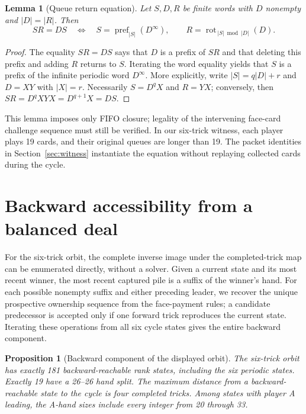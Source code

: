 \documentclass[11pt]{article}
\newtheorem{lemma}{Lemma}
\newtheorem{proposition}{Proposition}
\begin{document}
\begin{lemma}[Queue return equation]
Let $S,D,R$ be finite words with $D$ nonempty and $|D|=|R|$. Then
\[
SR=DS\quad\Longleftrightarrow\quad
S=\operatorname{pref}_{|S|}(D^\infty),\qquad
R=\operatorname{rot}_{\,|S|\bmod |D|}(D).
\]
\end{lemma}
\begin{proof}
The equality $SR=DS$ says that $D$ is a prefix of $S R$ and that deleting
this prefix and adding $R$ returns to $S$. Iterating the word equality yields
that $S$ is a prefix of the infinite periodic word $D^\infty$. More
explicitly, write $|S|=q|D|+r$ and $D=XY$ with $|X|=r$. Necessarily
$S=D^qX$ and $R=YX$; conversely, then
$SR=D^qXYX=D^{q+1}X=DS$.
\end{proof}

This lemma imposes only FIFO closure; legality of the intervening face-card
challenge sequence must still be verified. In our six-trick witness, each
player plays 19 cards, and their original queues are longer than 19. The
packet identities in Section~\ref{sec:witness} instantiate the equation without
replaying collected cards during the cycle.

\section{Backward accessibility from a balanced deal}

For the six-trick orbit, the complete inverse image under the completed-trick
map can be enumerated directly, without a solver. Given a current state and
its most recent winner, the most recent captured pile is a suffix of the
winner's hand. For each possible nonempty suffix and either preceding leader,
we recover the unique prospective ownership sequence from the face-payment
rules; a candidate predecessor is accepted only if one forward trick
reproduces the current state. Iterating these operations from all six
cycle states gives the entire backward component.

\begin{proposition}[Backward component of the displayed orbit]
The six-trick orbit has exactly 181 backward-reachable rank states,
including the six periodic states. Exactly 19 have a 26--26 hand split.
The maximum distance from a backward-reachable state to the cycle is four
completed tricks. Among states with player A leading, the A-hand sizes include
every integer from 20 through 33.
\end{proposition}
\end{document}
